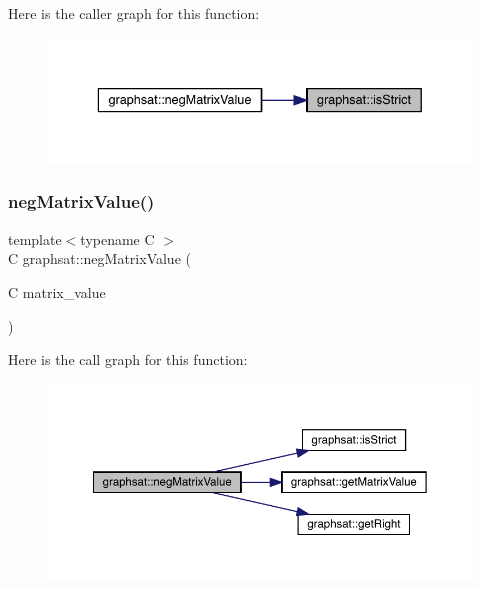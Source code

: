 Here is the caller graph for this function\+:
\nopagebreak
\begin{figure}[H]
\begin{center}
\leavevmode
\includegraphics[width=336pt]{namespacegraphsat_a8c9f56766915c3d206d61da59ce005d1_icgraph}
\end{center}
\end{figure}
\mbox{\label{namespacegraphsat_aced9a84b55f4f88b72bf2bce66e7e3bf}} 
\subsubsection{\texorpdfstring{negMatrixValue()}{negMatrixValue()}}
{\footnotesize\ttfamily template$<$typename C $>$ \\
C graphsat\+::neg\+Matrix\+Value (\begin{DoxyParamCaption}\item[{C}]{matrix\+\_\+value }\end{DoxyParamCaption})\hspace{0.3cm}{\ttfamily [inline]}}

Here is the call graph for this function\+:
\nopagebreak
\begin{figure}[H]
\begin{center}
\leavevmode
\includegraphics[width=350pt]{namespacegraphsat_aced9a84b55f4f88b72bf2bce66e7e3bf_cgraph}
\end{center}
\end{figure}
\mbox{\label{namespacegraphsat_a52f57679c1c2524761f4c398da1d9946}} 

